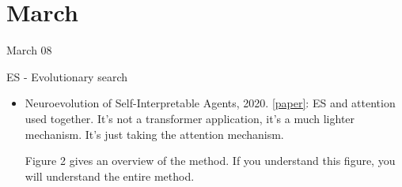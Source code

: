 \chapter{March}
March 08

ES - Evolutionary search
\begin{itemize}
	\item Neuroevolution of Self-Interpretable Agents, 2020.  \href{https://arxiv.org/pdf/2003.08165.pdf}{[paper]}: ES and attention used together. It's not a transformer application, it's a much lighter mechanism. It's just taking the attention mechanism. 
	
	Figure 2 gives an overview of the method. If you understand this figure, you will understand the entire method. 
\end{itemize}


